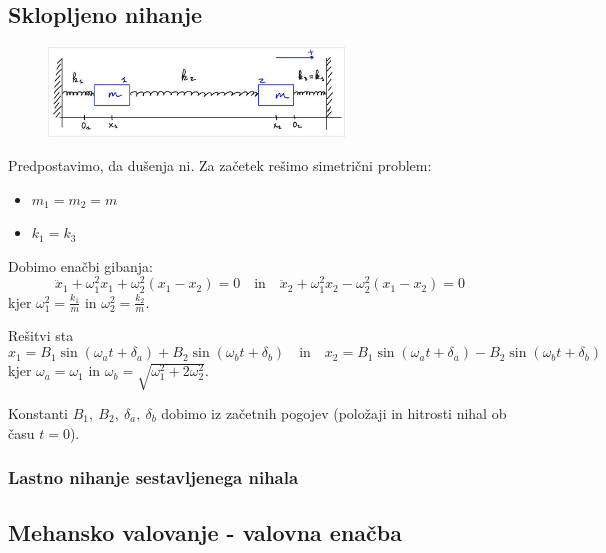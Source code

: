 \subsection{Sklopljeno nihanje}
\begin{figure}[h!]
    \centering
    \includegraphics[width=0.7\textwidth]{img/01_007.jpg}  
\end{figure}
Predpostavimo, da dušenja ni. Za začetek rešimo simetrični problem:
\begin{itemize}
    \item \(m_1 = m_2 = m\)
    \item \(k_1 = k_3\)
\end{itemize}
Dobimo enačbi gibanja:
\[
\boxed{\ddot{x}_1 + \omega_1^2 x_1 + \omega_2^2(x_1 - x_2) = 0 \quad \text{in} \quad \ddot{x}_2 + \omega_1^2x_2 - \omega_2^2(x_1 - x_2) = 0} 
\]
kjer \(\omega_1^2 = \frac{k_1}{m}\) in \(\omega_2^2 = \frac{k_2}{m}\).

Rešitvi sta 
\[
\boxed{x_1 = B_1 \sin(\omega_at + \delta_a) + B_2 \sin(\omega_bt + \delta_b) \quad \text{in} \quad x_2 = B_1 \sin(\omega_at + \delta_a) - B_2 \sin(\omega_bt + \delta_b)}
\]
kjer \(\omega_a = \omega_1\) in \(\omega_b = \sqrt{\omega_1^2 + 2\omega_2^2}\).

Konstanti \(B_1, \ B_2, \ \delta_a, \ \delta_b\) dobimo iz začetnih pogojev (položaji in hitrosti nihal ob času \(t = 0\)).

\subsubsection*{Lastno nihanje sestavljenega nihala}

\newpage
\subsection{Mehansko valovanje - valovna enačba}

